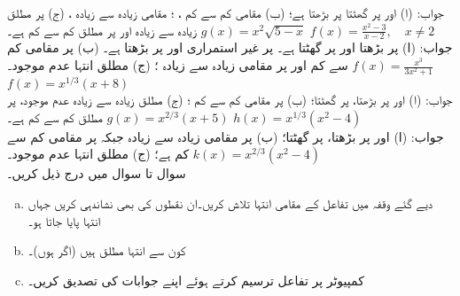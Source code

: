 جواب:\quad
(ا)  اور  پر گھٹتا  پر بڑھتا ہے؛ (ب) مقامی کم سے کم ، ؛ مقامی زیادہ سے زیادہ ،  (ج)  پر مطلق زیادہ سے زیادہ  اور  پر مطلق کم سے کم  ہے۔
$g(x)=x^2\sqrt{5-x}$
$f(x)=\tfrac{x^2-3}{x-2},\quad x\ne 2$\\
جواب:\quad
(ا)  پر بڑھتا  اور  پر گھٹتا ہے۔  پر غیر استمراری اور  پر بڑھتا ہے۔ (ب)  پر مقامی کم سے کم  اور  پر مقامی زیادہ سے زیادہ  ؛ (ج) مطلق انتہا عدم موجود۔
$f(x)=\tfrac{x^3}{3x^2+1}$
$f(x)=x^{1/3}(x+8)$\\
جواب:\quad
(ا)  اور  پر بڑھتا،  پر گھٹتا؛ (ب)  پر مقامی کم سے کم ؛ (ج) مطلق زیادہ سے زیادہ عدم موجود،  پر مطلق کم سے کم  ہے۔ 
$g(x)=x^{2/3}(x+5)$
$h(x)=x^{1/3}(x^2-4)$\\
جواب:\quad
(ا)  اور  پر بڑھتا،   پر گھٹتا؛ (ب)  پر مقامی زیادہ سے زیادہ  جبکہ  پر مقامی کم سے کم  ہے؛ (ج) مطلق انتہا عدم موجود۔
$k(x)=x^{2/3}(x^2-4)$
\\
سوال  تا سوال  میں درج ذیل کریں۔
\begin{enumerate}[a.]
\item
دیے گئے وقفہ میں تفاعل کے مقامی انتہا تلاش کریں۔ان نقطوں کی بھی نشاندہی کریں جہاں انتہا پایا جاتا ہو۔
\item
کون سے انتہا مطلق ہیں (اگر ہوں)۔
\item
کمپیوٹر پر تفاعل ترسیم کرتے ہوئے اپنے جوابات کی تصدیق کریں۔
\end{enumerate}

